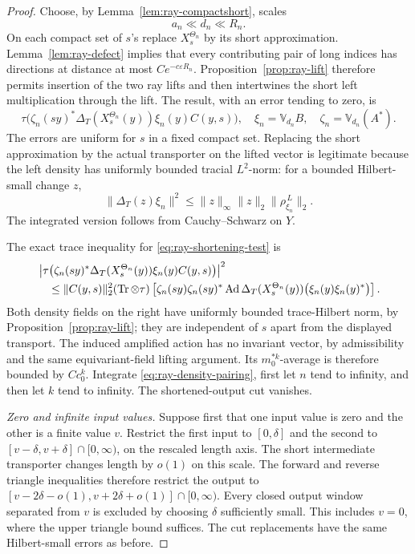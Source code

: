 \begin{proof}
Choose, by Lemma~\ref{lem:ray-compactshort}, scales
\[
 a_n\ll d_n\ll R_n .
\]
On each compact set of \(s\)'s replace \(X^{\Theta_n}_s\) by
its short approximation.  Lemma~\ref{lem:ray-defect} implies that every contributing
pair of long indices has directions at distance at most
\(C e^{-c\varepsilon R_n}\).  Proposition~\ref{prop:ray-lift}
therefore permits insertion of the two ray lifts and then
intertwines the short left multiplication through the lift.
The result, with an error tending to zero, is
\begin{equation}
 \tau\bigl(\zeta_n(sy)^*
       \Delta_T(X^{\Theta_n}_s(y))\xi_n(y)C(y,s)\bigr),
 \quad
 \xi_n=\mathbb V_{d_n}B,\quad
 \zeta_n=\mathbb V_{d_n}(A^*).
 \label{eq:ray-shortening-test}
\end{equation}
The errors are uniform for \(s\) in a fixed compact set.
Replacing the short approximation by the actual transporter
on the lifted vector is legitimate because the left density
has uniformly bounded tracial \(L^2\)-norm: for a bounded
Hilbert-small change \(z\),
\begin{equation}
 \|\Delta_T(z)\xi_n\|^2
 \le \|z\|_\infty\|z\|_2\|\rho^{\,L}_{\xi_n}\|_2 .
 \label{eq:ray-density-error}
\end{equation}
The integrated version follows from Cauchy--Schwarz on \(Y\).

The exact trace inequality for \eqref{eq:ray-shortening-test}
is
\begin{align}
 &\left|\tau\bigl(\zeta_n(sy)^*
       \Delta_T(X^{\Theta_n}_s(y))\xi_n(y)C(y,s)\bigr)\right|^2
 \nonumber\\
 &\quad\le
 \|C(y,s)\|_2^2
 (\operatorname{Tr}\otimes\tau)\left[
 \zeta_n(sy)\zeta_n(sy)^*
 \operatorname{Ad}\Delta_T(X^{\Theta_n}_s(y))
             \bigl(\xi_n(y)\xi_n(y)^*\bigr)\right].
 \label{eq:ray-density-pairing}
\end{align}
Both density fields on the right have uniformly bounded
trace-Hilbert norm, by Proposition~\ref{prop:ray-lift};
they are independent of \(s\) apart from the displayed transport.
The induced amplified action has no invariant vector, by
admissibility and the same equivariant-field lifting argument.
Its \(m_0^{*k}\)-average is therefore bounded by \(C c_0^k\).
Integrate \eqref{eq:ray-density-pairing}, first let \(n\)
tend to infinity, and then let \(k\) tend to infinity.
The shortened-output cut vanishes.

\par\smallskip\noindent\textit{Zero and infinite input values.}\quad
Suppose first that one input value is zero and the other is a
finite value \(v\).  Restrict the first input to \([0,\delta]\)
and the second to \([v-\delta,v+\delta]\cap[0,\infty)\), on the
rescaled length axis.  The short intermediate transporter changes
length by \(o(1)\) on this scale.  The forward and reverse triangle
inequalities therefore restrict the output to
\([v-2\delta-o(1),v+2\delta+o(1)]\cap[0,\infty)\).
Every closed output window separated from \(v\) is excluded by
choosing \(\delta\) sufficiently small.  This includes \(v=0\),
where the upper triangle bound suffices.  The cut replacements have
the same Hilbert-small errors as before.


\end{proof}
